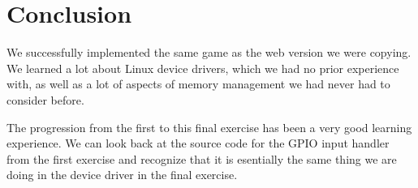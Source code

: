\chapter{Conclusion}
We successfully implemented the same game as the web version we were copying.
We learned a lot about Linux device drivers, which we had no prior experience with,
as well as a lot of aspects of memory management we had never had to consider before.

The progression from the first to this final exercise has been a very good learning experience.
We can look back at the source code for the GPIO input handler from the first exercise and recognize that it is esentially the same thing we are doing in the device driver in the final exercise.
